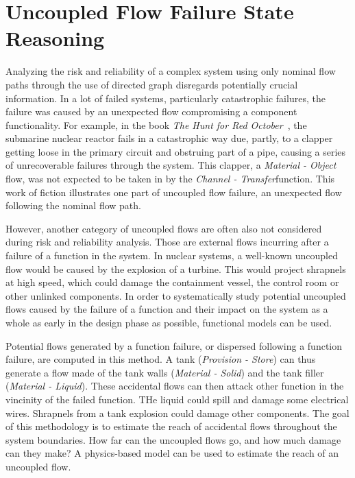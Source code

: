\section{Uncoupled Flow Failure State Reasoning}
\label{chap:uffsr}

Analyzing the risk and reliability of a complex system using only nominal flow paths through the use of directed graph disregards potentially crucial information. In a lot of failed systems, particularly catastrophic failures, the failure was caused by an unexpected flow compromising a component functionality. For example, in the book \textit{The Hunt for Red October}~\cite{hunt01}, the submarine nuclear reactor fails in a catastrophic way due, partly, to a clapper getting loose in the primary circuit and obstruing part of a pipe, causing a series of unrecoverable failures through the system. This clapper, a \textit{Material - Object} flow, was not expected to be taken in by the \textit{Channel - Transfer}function. This work of fiction illustrates one part of uncoupled flow failure, an unexpected flow following the nominal flow path.

However, another category of uncoupled flows are often also not considered during risk and reliability analysis. Those are external flows incurring after a failure of a function in the system. In nuclear systems, a well-known uncoupled flow would be caused by the explosion of a turbine. This would project shrapnels at high speed, which could damage the containment vessel, the control room or other unlinked components. In order to systematically study potential uncoupled flows caused by the failure of a function and their impact on the system as a whole as early in the design phase as possible, functional models can be used.

Potential flows generated by a function failure, or dispersed following a function failure, are computed in this method. A tank (\textit{Provision - Store}) can thus generate a flow made of the tank walls (\textit{Material - Solid}) and the tank filler (\textit{Material - Liquid}). These accidental flows can then attack other function in the vincinity of the failed function. THe liquid could spill and damage some electrical wires. Shrapnels from a tank explosion could damage other components. The goal of this methodology is to estimate the reach of accidental flows throughout the system boundaries. How far can the uncoupled flows go, and how much damage can they make? A physics-based model can be used to estimate the reach of an uncoupled flow.

